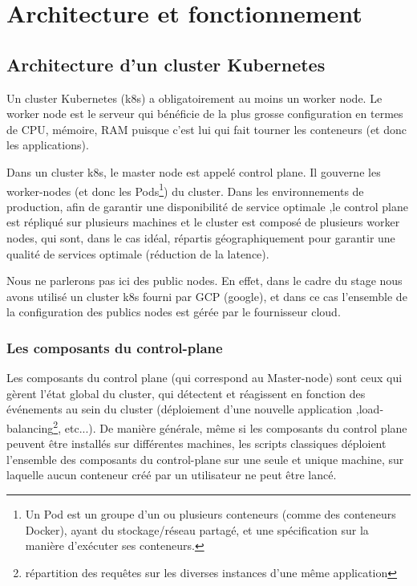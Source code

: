 \documentclass[11pt,fleqn]{book} %
\begin{document}
\appendix


\chapter{Architecture et fonctionnement}
\vspace{-2cm}
\label{Architecture}

\section*{Architecture d'un cluster Kubernetes}
Un cluster Kubernetes (k8s) a obligatoirement au moins un worker node. Le worker node est le serveur qui bénéficie de la plus grosse configuration en termes de CPU, mémoire, RAM puisque c'est lui qui fait tourner les conteneurs (et donc les applications).\newline 

Dans un cluster k8s, le  master node est appelé control plane. Il gouverne les worker-nodes (et donc les Pods\footnote{Un Pod est un groupe d'un ou plusieurs conteneurs (comme des conteneurs Docker), ayant du stockage/réseau partagé, et une spécification sur la manière d'exécuter ses conteneurs.}) du cluster. Dans les environnements de production, afin de garantir une disponibilité de service optimale ,le control plane est répliqué sur plusieurs machines et le cluster est composé de plusieurs worker nodes, qui sont, dans le cas idéal, répartis géographiquement pour garantir une qualité de services optimale (réduction de la latence).\newline

Nous ne parlerons pas ici des public nodes. En effet, dans le cadre du stage nous avons utilisé un cluster k8s fourni par GCP (google), et dans ce cas l'ensemble de la configuration des publics nodes est gérée par le fournisseur cloud.


\subsection*{Les composants du control-plane}
Les composants du control plane (qui correspond au Master-node) sont ceux qui gèrent l'état global du cluster, qui détectent et réagissent en fonction des événements au sein du cluster (déploiement d'une nouvelle application ,load-balancing\footnote{répartition des requêtes sur les diverses instances d'une même application}, etc...). De manière générale, même si les composants du control plane peuvent être installés sur différentes machines, les scripts classiques déploient l'ensemble des composants du control-plane sur une seule et unique machine, sur laquelle aucun conteneur créé par un utilisateur ne peut être lancé.
\end{document}
